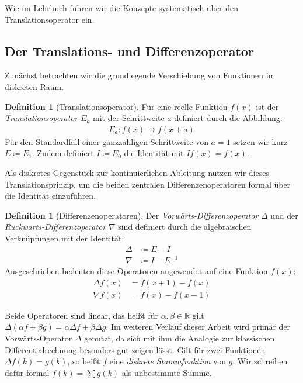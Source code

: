 \documentclass{article}
\theoremstyle{definition}
\newtheorem{defn}[thm]{Definition}
\begin{document}
Wie im Lehrbuch \cite{aigner} führen wir die Konzepte systematisch über den Translationsoperator ein.

\subsection{Der Translations- und Differenzoperator}
Zunächst betrachten wir die grundlegende Verschiebung von Funktionen im diskreten Raum.

\begin{defn}[Translationsoperator]
Für eine reelle Funktion $f(x)$ ist der \textit{Translationsoperator} $E_a$ mit der Schrittweite $a$ definiert durch die Abbildung:
\begin{align*}
    E_a : f(x) \to f(x + a)
\end{align*}
Für den Standardfall einer ganzzahligen Schrittweite von $a = 1$ setzen wir kurz $E \coloneqq E_1$. Zudem definiert $I \coloneqq E_0$ die Identität mit $I f(x) = f(x)$. 
\end{defn}

Als diskretes Gegenstück zur kontinuierlichen Ableitung nutzen wir dieses Translationsprinzip, um die beiden zentralen Differenzenoperatoren formal über die Identität einzuführen.

\begin{defn}[Differenzenoperatoren]
Der \textit{Vorwärts-Differenzoperator} $\Delta$ und der \textit{Rückwärts-Differenzoperator} $\nabla$ sind definiert durch die algebraischen Verknüpfungen mit der Identität:
\begin{align*}
    \Delta &\coloneqq E - I \\
    \nabla &\coloneqq I - E^{-1}
\end{align*}
Ausgeschrieben bedeuten diese Operatoren angewendet auf eine Funktion $f(x)$:
\begin{align*}
    \Delta f(x) &= f(x+1) - f(x) \\
    \nabla f(x) &= f(x) - f(x-1)
\end{align*}
\end{defn}

Beide Operatoren sind linear, das heißt für $\alpha, \beta \in \mathbb{R}$ gilt $\Delta(\alpha f + \beta g) = \alpha \Delta f + \beta \Delta g$. Im weiteren Verlauf dieser Arbeit wird primär der Vorwärts-Operator $\Delta$ genutzt, da sich mit ihm die Analogie zur klassischen Differentialrechnung besonders gut zeigen lässt. Gilt für zwei Funktionen $\Delta f(k) = g(k)$, so heißt $f$ eine \textit{diskrete Stammfunktion} von $g$. Wir schreiben dafür formal $f(k) = \sum g(k)$ als unbestimmte Summe.
\end{document}
